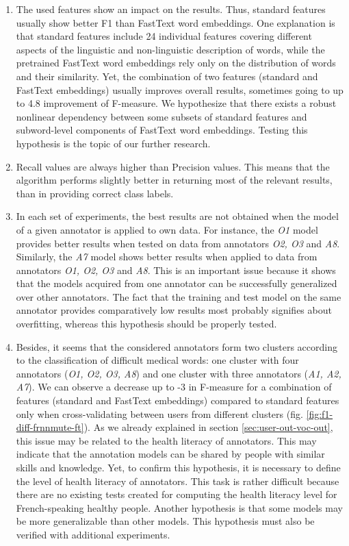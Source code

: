 \begin{enumerate}[listparindent=1.5em]
    \item The used features show an impact on the results. Thus, standard features usually show better F1 than FastText word embeddings. One explanation is that standard features include 24 individual features covering different aspects of the linguistic and non-linguistic description of words, while the pretrained FastText word embeddings rely only on the distribution of words and their similarity. Yet, the combination of two features (standard and FastText embeddings) usually improves overall results, sometimes going to up to 4.8 improvement of F-measure.  We hypothesize that there exists a robust nonlinear dependency between some subsets of standard features and subword-level components of FastText word embeddings. Testing this hypothesis is the topic of our further research.
    
    \item Recall values are always higher than Precision values. This means that the algorithm performs slightly better in returning most of the relevant results, than in providing correct class labels. 
    
    \item In each set of experiments, the best results are not obtained when the model of a given annotator is applied to own data. For instance, the {\it O1} model provides better results when tested on data from annotators {\it O2, O3} and {\it A8}.  Similarly, the {\it A7} model shows better results when applied to data from annotators {\it O1, O2, O3} and {\it A8}. This is an important issue because it shows that the models acquired from one annotator can be successfully generalized over other annotators. The fact that the training and test model on the same annotator provides comparatively low results most probably signifies about overfitting, whereas this hypothesis should be properly tested.
    
    \item Besides, it seems that the considered annotators form two clusters according to the classification of difficult medical words: one cluster with four annotators ({\it O1, O2, O3, A8}) and one cluster with three annotators ({\it A1, A2, A7}). We can observe a decrease up to -3 in F-measure for a combination of features (standard and FastText embeddings) compared to standard features only when cross-validating between users from different clusters (fig. \ref{fig:f1-diff-frnnmute-ft}). As we already explained in section \ref{sec:user-out-voc-out}, this issue may be related to the health literacy of annotators. This may indicate that the annotation models can be shared by people with similar skills and knowledge. Yet, to confirm this hypothesis, it is necessary to define the level of health literacy of annotators. This task is rather difficult because there are no existing tests created for computing the health literacy level for French-speaking healthy people. Another hypothesis is that some models may be more generalizable than other models. This hypothesis must also be verified with additional experiments.
\end{enumerate}

